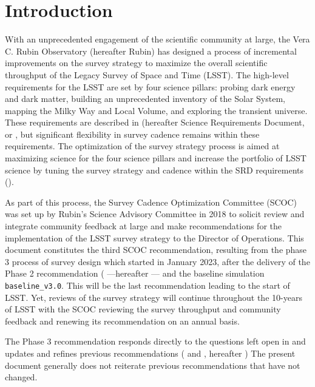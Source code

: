 \section{Introduction}

With an unprecedented engagement of the scientific community at large, the Vera C. Rubin Observatory (hereafter Rubin) has designed a process of incremental improvements on the survey strategy to maximize the overall scientific throughput of the Legacy Survey of Space and Time (LSST). The high-level requirements for the LSST are set by four science pillars: probing dark energy and dark matter, building an unprecedented inventory of the Solar System, mapping the Milky Way and Local Volume, and exploring the transient universe. These requirements are described in \cite{LPM-17} (hereafter Science Requirements Document, or , but significant flexibility in survey cadence remains within these requirements. The optimization of the survey strategy process is aimed at maximizing science for the four science pillars and increase the portfolio of LSST science by tuning the survey strategy and cadence within the SRD requirements ().

As part of this process, the Survey Cadence Optimization Committee (SCOC) was set up by Rubin's Science Advisory Committee in 2018 to solicit review and integrate community feedback at large and make recommendations for the implementation of the LSST survey strategy to the Director of Operations. This document constitutes the third SCOC recommendation, resulting from the phase 3 process of survey design which started in January 2023, after the delivery of the Phase 2 recommendation  (\citealt{PSTN-055} ---hereafter --- and the baseline simulation \texttt{baseline\_v3.0}. This will be the last recommendation leading to the start of LSST. Yet, reviews of the survey strategy will continue throughout the 10-years of LSST with the SCOC reviewing the survey throughput and community feedback and renewing its recommendation on an annual basis. 

The Phase 3 recommendation responds directly to the questions left open in  and updates and refines previous recommendations ( and \cite{PSTN-053}, hereafter ) The present document generally does not reiterate previous recommendations that have not changed.



